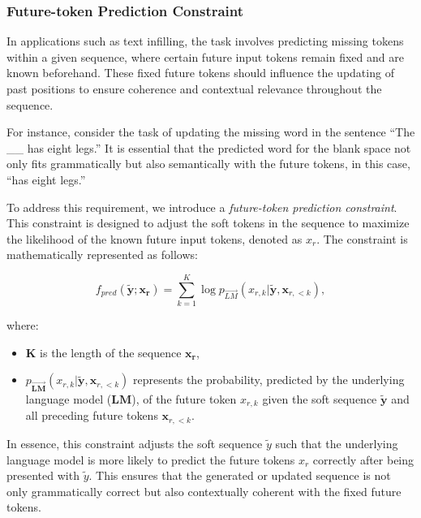 \documentclass{article}
\begin{document}
\subsubsection{Future-token Prediction Constraint}
In applications such as text infilling, the task involves predicting missing tokens within a given sequence, where certain future input tokens remain fixed and are known beforehand. These fixed future tokens should influence the updating of past positions to ensure coherence and contextual relevance throughout the sequence.

For instance, consider the task of updating the missing word in the sentence ``The \_\_ has eight legs.'' It is essential that the predicted word for the blank space not only fits grammatically but also semantically with the future tokens, in this case, ``has eight legs.''

To address this requirement, we introduce a \emph{future-token prediction constraint}. This constraint is designed to adjust the soft tokens in the sequence to maximize the likelihood of the known future input tokens, denoted as \(x_r\). The constraint is mathematically represented as follows:

\begin{equation}
    f_{pred}(\mathbf{\tilde{y}}; \mathbf{x_r}) = \sum_{k=1}^{K} \log {p}_{\overrightarrow{LM}}({x_{r,k}}|\mathbf{\tilde{y}}, {\mathbf{x}_{r,<k}}),
\end{equation}

where:
\begin{itemize}
    \item \(\mathbf{K}\) is the length of the sequence \(\mathbf{x_r}\),
    \item \(p_{\mathbf{\overrightarrow{LM}}}(x_{r,k}|\mathbf{\tilde{y}}, \mathbf{x}_{r,<k})\) represents the probability, predicted by the underlying language model (\(\mathbf{LM}\)), of the future token \(x_{r,k}\) given the soft sequence \(\mathbf{\tilde{y}}\) and all preceding future tokens \(\mathbf{x}_{r,<k}\).
\end{itemize}



In essence, this constraint adjusts the soft sequence \(\tilde{y}\) such that the underlying language model is more likely to predict the future tokens \(x_r\) correctly after being presented with \(\tilde{y}\). This ensures that the generated or updated sequence is not only grammatically correct but also contextually coherent with the fixed future tokens.
\end{document}
